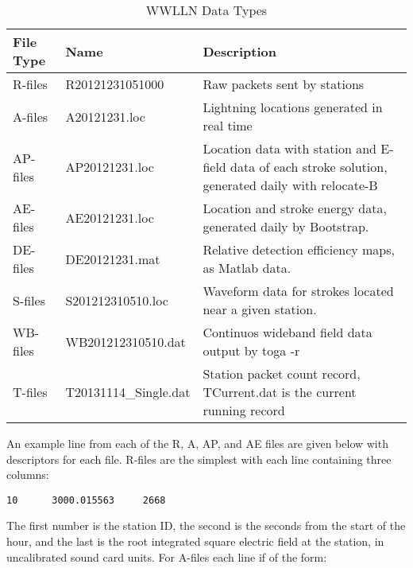 \begin{table}[h!]
\begin{center}
\caption{WWLLN Data Types}
\begin{tabular}{|p{.75in}|p{1.5in}|p{3.5in}|}

\hline
{\bf File Type} & {\bf Name} &	{\bf Description} \\

\hline
\rule{0pt}{3ex}
R-files	& R20121231051000	&	Raw packets sent by stations\\ 

\hline
\rule{0pt}{3ex}
A-files	& A20121231.loc	&	Lightning locations generated in real time\\ 

\hline
\rule{0pt}{3ex}
AP-files	& AP20121231.loc	&	Location data with station and E-field data of each stroke solution, generated daily with relocate-B\\ 

\hline
\rule{0pt}{3ex}
AE-files	& AE20121231.loc	&	Location and stroke energy data, generated daily by Bootstrap.\\ 

\hline
\rule{0pt}{3ex}
DE-files	& DE20121231.mat	&	Relative detection efficiency maps, as Matlab data.\\ 

\hline
\rule{0pt}{3ex}
S-files	& S201212310510.loc	&	Waveform data for strokes located near a given station.\\ 

\hline
\rule{0pt}{3ex}
WB-files	& WB201212310510.dat	&	Continuos wideband field data output by toga -r\\ 

\hline
\rule{0pt}{3ex}
T-files	& T20131114\_Single.dat	&	Station packet count record, TCurrent.dat is the current running record\\ 

\hline
\end{tabular}
\end{center}
\label{code:table:fileType}
\end{table}
 
An example line from each of the R, A, AP, and AE files are given below with descriptors for each file.
R-files are the simplest with each line containing three columns:

\begin{verbatim}
10      3000.015563     2668
\end{verbatim}

The first number is the station ID, the second is the seconds from the start of the hour, and the last is the root integrated square electric field at the station, in uncalibrated sound card units.
For A-files each line if of the form:

